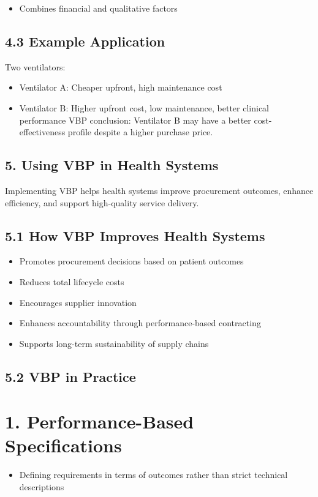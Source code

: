 \documentclass[10pt]{article}
\begin{document}
\begin{itemize}
  \item Combines financial and qualitative factors
\end{itemize}

\subsection*{4.3 Example Application}
Two ventilators:

\begin{itemize}
  \item Ventilator A: Cheaper upfront, high maintenance cost
  \item Ventilator B: Higher upfront cost, low maintenance, better clinical performance VBP conclusion: Ventilator B may have a better cost-effectiveness profile despite a higher purchase price.
\end{itemize}

\subsection*{5. Using VBP in Health Systems}
Implementing VBP helps health systems improve procurement outcomes, enhance efficiency, and support high-quality service delivery.

\subsection*{5.1 How VBP Improves Health Systems}
\begin{itemize}
  \item Promotes procurement decisions based on patient outcomes
  \item Reduces total lifecycle costs
  \item Encourages supplier innovation
  \item Enhances accountability through performance-based contracting
  \item Supports long-term sustainability of supply chains
\end{itemize}

\subsection*{5.2 VBP in Practice}
\section*{1. Performance-Based Specifications}
\begin{itemize}
  \item Defining requirements in terms of outcomes rather than strict technical descriptions
\end{itemize}
\end{document}
